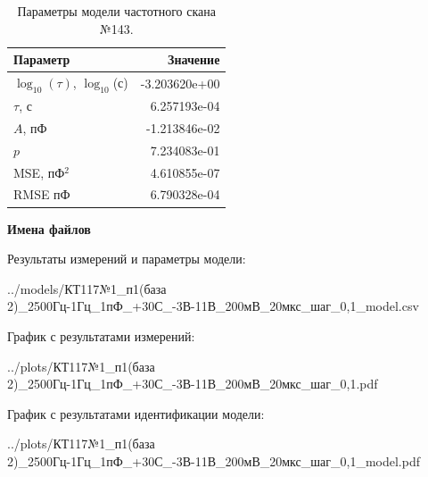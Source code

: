 \begin{table}[!ht]
    \centering
    \caption{Параметры модели частотного скана №143.}
    \begin{tabular}{|l|r|}
        \hline
        Параметр                                       & Значение                  \\ \hline
        $\log_{10}(\tau)$, $\log_{10}$(с)              & -3.203620e+00             \\ \hline
        $\tau$, с                                      & 6.257193e-04              \\ \hline
        $A$, пФ                                        & -1.213846e-02             \\ \hline
        $p$                                            & 7.234083e-01              \\ \hline
        MSE, пФ$^2$                                    & 4.610855e-07              \\ \hline
        RMSE пФ                                        & 6.790328e-04              \\ \hline
    \end{tabular}
    \label{table:frequency_scan_model_143}
\end{table}

\textbf{Имена файлов}

Результаты измерений и параметры модели:

\scriptsize../models/КТ117№1\_п1(база 2)\_2500Гц-1Гц\_1пФ\_+30С\_-3В-11В\_200мВ\_20мкс\_шаг\_0,1\_model.csv
\normalsize

График с результатами измерений:

\scriptsize../plots/КТ117№1\_п1(база 2)\_2500Гц-1Гц\_1пФ\_+30С\_-3В-11В\_200мВ\_20мкс\_шаг\_0,1.pdf
\normalsize

График с результатами идентификации модели:

\scriptsize../plots/КТ117№1\_п1(база 2)\_2500Гц-1Гц\_1пФ\_+30С\_-3В-11В\_200мВ\_20мкс\_шаг\_0,1\_model.pdf
\normalsize

